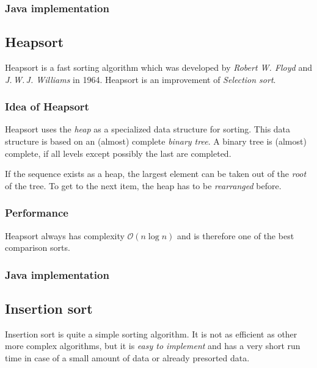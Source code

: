 \documentclass[]{pfBook}
\newcommand{\OO}{\mathcal{O}}
\begin{document}
	\subsubsection{Java implementation}
	
	
	
	\subsection{Heapsort}
	
	Heapsort is a fast sorting algorithm which was developed by \emph{Robert W. Floyd} and \emph{J.\,W.\,J. Williams} in 1964. Heapsort is an improvement of \emph{Selection sort}.
	
	\subsubsection{Idea of Heapsort}
	
	Heapsort uses the \emph{heap} as a specialized data structure for sorting. This data structure is based on an (almost) complete \emph{binary tree}. A binary tree is (almost) complete, if all levels except possibly the last are completed.
	
	If the sequence exists as a heap, the largest element can be taken out of the \emph{root} of the tree. To get to the next item, the heap has to be \emph{rearranged} before.
	
	\subsubsection{Performance}
	
	Heapsort always has complexity $\OO(n \log n)$ and is therefore one of the best comparison sorts.
	
	\subsubsection{Java implementation}
	
	
	
	\subsection{Insertion sort}
	
	Insertion sort is quite a simple sorting algorithm. It is not as efficient as other more complex algorithms, but it is \emph{easy to implement} and has a very short run time in case of a small amount of data or already presorted data.
	
\end{document}
